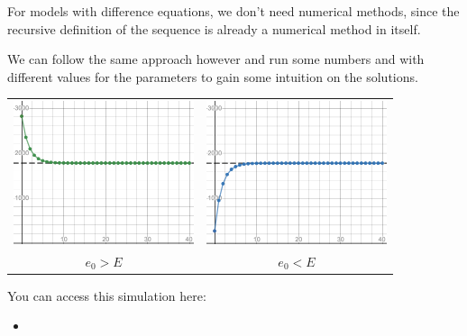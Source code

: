 For models with difference equations, we don't need numerical methods, since the recursive definition of the sequence is already a numerical method in itself.

We can follow the same approach however and run some numbers and with different values for the parameters to gain some intuition on the solutions.

\begin{center}
\begin{tabular}{cc}
\includegraphics*[width=150pt]{images/module26-stud-above.png}
	& \includegraphics*[width=150pt]{images/module26-stud-below.png} \\
$e_0 > E$ 
	& $e_0 < E$
\end{tabular}
\end{center}
 

\begin{graybox}
You can access this simulation here:
\begin{itemize}
	\item {}
\end{itemize}	
\end{graybox}






